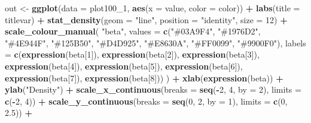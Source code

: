 \documentclass[
]{article}
\newenvironment{Shaded}{\begin{snugshade}}{\end{snugshade}}
\newcommand{\AttributeTok}[1]{\textcolor[rgb]{0.13,0.29,0.53}{#1}}
\newcommand{\DecValTok}[1]{\textcolor[rgb]{0.00,0.00,0.81}{#1}}
\newcommand{\FloatTok}[1]{\textcolor[rgb]{0.00,0.00,0.81}{#1}}
\newcommand{\FunctionTok}[1]{\textcolor[rgb]{0.13,0.29,0.53}{\textbf{#1}}}
\newcommand{\NormalTok}[1]{#1}
\newcommand{\OtherTok}[1]{\textcolor[rgb]{0.56,0.35,0.01}{#1}}
\newcommand{\SpecialCharTok}[1]{\textcolor[rgb]{0.81,0.36,0.00}{\textbf{#1}}}
\newcommand{\StringTok}[1]{\textcolor[rgb]{0.31,0.60,0.02}{#1}}
\begin{document}
\begin{Shaded}
\begin{Highlighting}[]
\NormalTok{  out }\OtherTok{\textless{}{-}} \FunctionTok{ggplot}\NormalTok{(}\AttributeTok{data =}\NormalTok{ plot100\_1, }\FunctionTok{aes}\NormalTok{(}\AttributeTok{x =}\NormalTok{ value, }\AttributeTok{color =}\NormalTok{ color)) }\SpecialCharTok{+}
    \FunctionTok{labs}\NormalTok{(}\AttributeTok{title =}\NormalTok{ titlevar) }\SpecialCharTok{+} 
    \FunctionTok{stat\_density}\NormalTok{(}\AttributeTok{geom =} \StringTok{"line"}\NormalTok{, }\AttributeTok{position =} \StringTok{"identity"}\NormalTok{, }\AttributeTok{size =} \DecValTok{12}\NormalTok{) }\SpecialCharTok{+}
    \FunctionTok{scale\_colour\_manual}\NormalTok{(}
      \StringTok{"beta"}\NormalTok{,}
      \AttributeTok{values =} \FunctionTok{c}\NormalTok{(}\StringTok{"\#03A9F4"}\NormalTok{, }\StringTok{"\#1976D2"}\NormalTok{, }\StringTok{"\#4E944F"}\NormalTok{, }\StringTok{"\#125B50"}\NormalTok{,}
                 \StringTok{"\#D4D925"}\NormalTok{, }\StringTok{"\#E8630A"}\NormalTok{, }\StringTok{"\#FF0099"}\NormalTok{, }\StringTok{"\#9900F0"}\NormalTok{),}
      \AttributeTok{labels =} \FunctionTok{c}\NormalTok{(}\FunctionTok{expression}\NormalTok{(beta[}\DecValTok{1}\NormalTok{]), }\FunctionTok{expression}\NormalTok{(beta[}\DecValTok{2}\NormalTok{]), }
                 \FunctionTok{expression}\NormalTok{(beta[}\DecValTok{3}\NormalTok{]), }\FunctionTok{expression}\NormalTok{(beta[}\DecValTok{4}\NormalTok{]), }
                 \FunctionTok{expression}\NormalTok{(beta[}\DecValTok{5}\NormalTok{]), }\FunctionTok{expression}\NormalTok{(beta[}\DecValTok{6}\NormalTok{]), }
                 \FunctionTok{expression}\NormalTok{(beta[}\DecValTok{7}\NormalTok{]), }\FunctionTok{expression}\NormalTok{(beta[}\DecValTok{8}\NormalTok{]))}
\NormalTok{    ) }\SpecialCharTok{+}
    \FunctionTok{xlab}\NormalTok{(}\FunctionTok{expression}\NormalTok{(beta)) }\SpecialCharTok{+}
    \FunctionTok{ylab}\NormalTok{(}\StringTok{"Density"}\NormalTok{) }\SpecialCharTok{+}
    \FunctionTok{scale\_x\_continuous}\NormalTok{(}\AttributeTok{breaks =} \FunctionTok{seq}\NormalTok{(}\SpecialCharTok{{-}}\DecValTok{2}\NormalTok{, }\DecValTok{4}\NormalTok{, }\AttributeTok{by =} \DecValTok{2}\NormalTok{), }\AttributeTok{limits =} \FunctionTok{c}\NormalTok{(}\SpecialCharTok{{-}}\DecValTok{2}\NormalTok{, }\DecValTok{4}\NormalTok{)) }\SpecialCharTok{+} 
    \FunctionTok{scale\_y\_continuous}\NormalTok{(}\AttributeTok{breaks =} \FunctionTok{seq}\NormalTok{(}\DecValTok{0}\NormalTok{, }\DecValTok{2}\NormalTok{, }\AttributeTok{by =} \DecValTok{1}\NormalTok{), }\AttributeTok{limits =} \FunctionTok{c}\NormalTok{(}\DecValTok{0}\NormalTok{, }\FloatTok{2.5}\NormalTok{)) }\SpecialCharTok{+} 

\end{Highlighting}
\end{Shaded}
\end{document}
